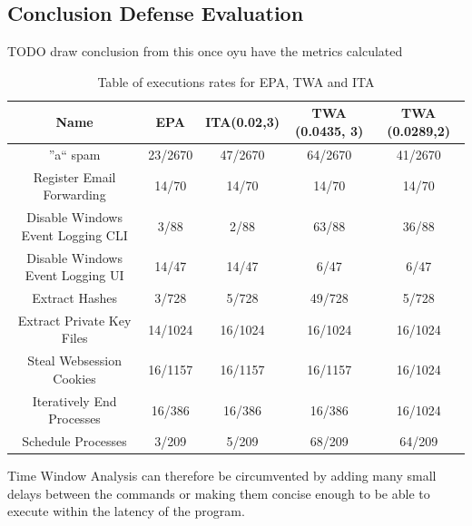 
\subsection{Conclusion Defense Evaluation}

TODO draw conclusion from this once oyu have the metrics calculated


\begin{table}[h]
\centering
\begin{tabular}{|c|c|c|c|c|}
\hline
Name & EPA &  ITA(0.02,3) & TWA (0.0435, 3) & TWA (0.0289,2) \\
\hline
''a`` spam & 23/2670 & 47/2670 & 64/2670 & 41/2670 \\
\hline
Register Email Forwarding & 14/70 & 14/70 & 14/70 & 14/70 \\
\hline
Disable Windows Event Logging CLI & 3/88 & 2/88 & 63/88 & 36/88 \\
\hline
Disable Windows Event Logging UI & 14/47 & 14/47 & 6/47 & 6/47 \\
\hline
Extract Hashes & 3/728 & 5/728 & 49/728 & 5/728 \\
\hline
Extract Private Key Files & 14/1024 & 16/1024 & 16/1024 & 16/1024 \\
\hline
Steal Websession Cookies & 16/1157 & 16/1157 & 16/1157 & 16/1024 \\
\hline
Iteratively End Processes & 16/386 & 16/386 & 16/386 & 16/1024 \\
\hline
Schedule Processes & 3/209 & 5/209 & 68/209 & 64/209 \\
\hline
\end{tabular}
\caption{Table of executions rates for EPA, TWA and ITA}
\end{table}

Time Window Analysis can therefore be circumvented by adding many small delays between the commands or making them concise enough to be able to execute within the latency of the program. \\








